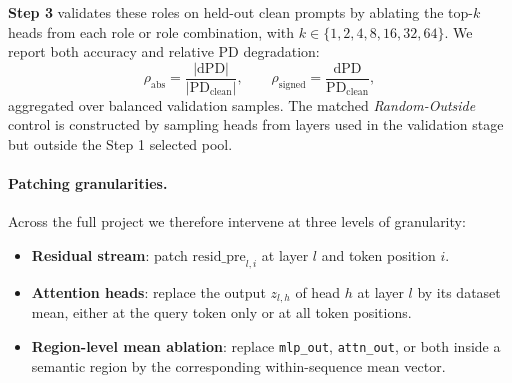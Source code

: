 \documentclass[11pt]{article}
\begin{document}
\textbf{Step 3} validates these roles on held-out clean prompts by ablating the top-$k$ heads from each role or role combination, with $k \in \{1,2,4,8,16,32,64\}$. We report both accuracy and relative PD degradation:
\begin{equation}
\rho_{\mathrm{abs}} = \frac{|\mathrm{dPD}|}{|\mathrm{PD}_{\mathrm{clean}}|}, \qquad
\rho_{\mathrm{signed}} = \frac{\mathrm{dPD}}{\mathrm{PD}_{\mathrm{clean}}},
\end{equation}
aggregated over balanced validation samples. The matched \textit{Random-Outside} control is constructed by sampling heads from layers used in the validation stage but outside the Step 1 selected pool.

\paragraph{Patching granularities.}
Across the full project we therefore intervene at three levels of granularity:
\begin{itemize}
    \item \textbf{Residual stream}: patch $\mathrm{resid\_pre}_{l,i}$ at layer $l$ and token position $i$.
    \item \textbf{Attention heads}: replace the output $z_{l,h}$ of head $h$ at layer $l$ by its dataset mean, either at the query token only or at all token positions.
    \item \textbf{Region-level mean ablation}: replace \texttt{mlp\_out}, \texttt{attn\_out}, or both inside a semantic region by the corresponding within-sequence mean vector.
\end{itemize}
\end{document}
